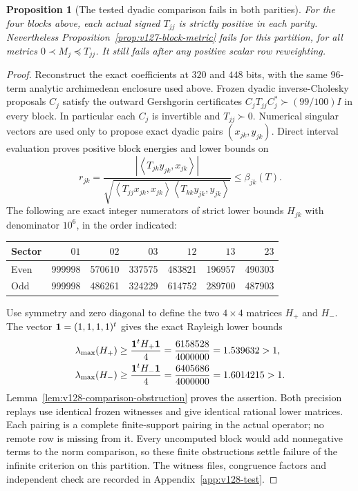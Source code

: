 \documentclass[11pt]{article}
\newtheorem{proposition}[theorem]{Proposition}
\theoremstyle{remark}
\newcommand{\ip}[2]{\left\langle #1,#2\right\rangle}
\begin{document}
\begin{proposition}[The tested dyadic comparison fails in both parities]
\label{prop:v128-dyadic-fails}
For the four blocks above, each actual signed $T_{jj}$ is strictly
positive in each parity. Nevertheless
Proposition~\ref{prop:v127-block-metric} fails for this partition,
for all metrics $0\prec M_j\preceq T_{jj}$. It still fails after
any positive scalar row reweighting.
\end{proposition}
\begin{proof}
Reconstruct the exact coefficients at $320$ and $448$ bits, with the
same $96$-term analytic archimedean enclosure used above. Frozen
dyadic inverse-Cholesky proposals $C_j$ satisfy the outward
Gershgorin certificates $C_jT_{jj}C_j^*\succ(99/100)I$ in every
block. In particular each $C_j$ is invertible and $T_{jj}\succ0$.
Numerical singular vectors are used only to propose exact dyadic
pairs $(x_{jk},y_{jk})$. Direct interval evaluation proves positive
block energies and lower bounds on
\[
 r_{jk}=\frac{|\ip{T_{jk}y_{jk}}{x_{jk}}|}
 {\sqrt{\ip{T_{jj}x_{jk}}{x_{jk}}
              \ip{T_{kk}y_{jk}}{y_{jk}}}}
 \le\beta_{jk}(T).
\]
The following are exact integer numerators of strict lower bounds
$H_{jk}$ with denominator $10^6$, in the order indicated:
\begin{center}
\begin{tabular}{lrrrrrr}
\toprule
Sector & $01$ & $02$ & $03$ & $12$ & $13$ & $23$\\
\midrule
Even &999998&570610&337575&483821&196957&490303\\
Odd  &999998&486261&324229&614752&289700&487903\\
\bottomrule
\end{tabular}
\end{center}
Use symmetry and zero diagonal to define the two $4\times4$ matrices
$H_+$ and $H_-$. The vector ${\bf1}=(1,1,1,1)^t$ gives the exact
Rayleigh lower bounds
\begin{align*}
 \lambda_{\max}(H_+)&\ge
 \frac{{\bf1}^tH_+{\bf1}}4
 =\frac{6158528}{4000000}=1.539632>1,\\
 \lambda_{\max}(H_-)&\ge
 \frac{{\bf1}^tH_-{\bf1}}4
 =\frac{6405686}{4000000}=1.6014215>1.
\end{align*}
Lemma~\ref{lem:v128-comparison-obstruction} proves the assertion.
Both precision replays use identical frozen witnesses and give
identical rational lower matrices. Each pairing is a complete
finite-support pairing in the actual operator; no remote row is
missing from it. Every uncomputed block would add nonnegative terms
to the norm comparison, so these finite obstructions settle failure
of the infinite criterion on this partition. The witness files,
congruence factors and independent check are recorded in
Appendix~\ref{app:v128-test}.
\end{proof}
\end{document}
